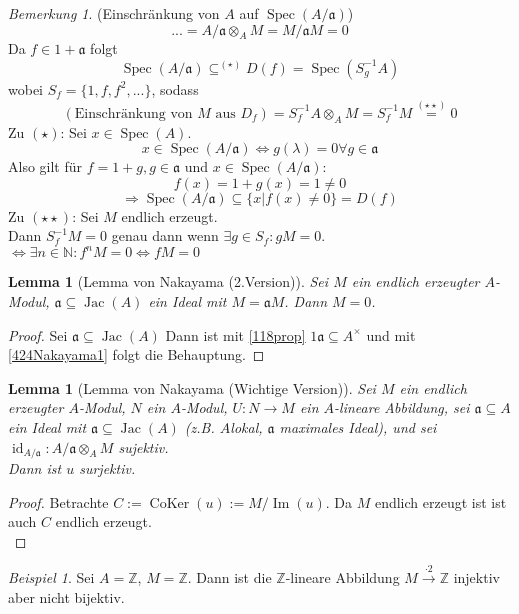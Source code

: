 \documentclass[10pt,a4paper]{article}
\newcommand{\N}{\ensuremath{\mathbb{N}}}
\newcommand{\Z}{\ensuremath{\mathbb{Z}}}
\newcommand{\la}{\ensuremath{\lambda}}
\newcommand{\Img}{\ensuremath{\operatorname{Im}}}
\newcommand{\Spec}{\ensuremath{\operatorname{Spec}}}
\newcommand{\id}{\operatorname{id}}
\newcommand{\CoKer}{\operatorname{CoKer}}
\newcommand{\Jac}{\ensuremath{\operatorname{Jac}}}
\newcounter{thm}[section]
\theoremstyle{definition}
\theoremstyle{plain}
\newtheorem{lem}[thm]{Lemma}
\theoremstyle{remark}
\newtheorem*{bem*}{Bemerkung}
\newtheorem*{exm*}{Beispiel}
\begin{document}
\begin{bem*}
	(Einschränkung von $A$ auf $\Spec(A/\mathfrak a)$)
	\[...=A/\mathfrak a\otimes_AM=M/\mathfrak aM=0\]
	Da $f\in 1+\mathfrak a$ folgt
	\[\Spec(A/\mathfrak a)\subseteq^{(\star)}D(f)=\Spec(S_{g}^{-1}A)\]
	wobei $S_f=\{1,f,f^2,...\}$, sodass
	\[(\text{Einschränkung von $M$ aus $D_f$})=S_f^{-1}A\otimes_AM=S_f^{-1}M\overset{(\star\star)}{=}0\]
	Zu $(\star)$: Sei $x\in\Spec(A)$.
	\[x\in\Spec(A/\mathfrak a)\Leftrightarrow g(\la)=0\forall g\in\mathfrak a \]
	Also gilt für $f=1+g,g\in\mathfrak a$ und $x\in\Spec(A/\mathfrak a)$:
	\[f(x)=1+g(x)=1\neq 0\]
	\[\Rightarrow \Spec(A/\mathfrak a)\subseteq \{x|f(x)\neq 0\}=D(f)\]
	Zu $(\star\star)$: Sei $M$ endlich erzeugt.\\
	Dann $S^{-1}_fM=0$ genau dann wenn $\exists g\in S_f:gM=0$.\\
	$\Leftrightarrow \exists n\in \N: f^nM=0\Leftrightarrow fM=0$
\end{bem*}

\begin{lem}[Lemma von Nakayama (2.Version)]
	\label{425Nakayama2}
	Sei $M$ ein endlich erzeugter $A$-Modul, $\mathfrak a\subseteq\Jac(A)$ ein Ideal mit $M=\mathfrak aM$. Dann $M=0$.
\end{lem}
\begin{proof}
	Sei $\mathfrak a\subseteq \Jac(A)$ Dann ist mit \ref{118prop} $1\mathfrak a\subseteq A^\times$ und mit \ref{424Nakayama1} folgt die Behauptung.
\end{proof}

\begin{lem}[Lemma von Nakayama (Wichtige Version)]
	\label{427Nakayamaw}
	Sei $M$ ein endlich erzeugter $A$-Modul, $N$ ein $A$-Modul, $U:N\rightarrow  M$ ein $A$-lineare Abbildung, sei $\mathfrak a\subseteq A$ ein Ideal mit $\mathfrak a\subseteq \Jac(A)$ (z.B. $A$lokal, $\mathfrak a$ maximales Ideal),
	und sei $\id_{A/\mathfrak a}:A/\mathfrak a\otimes_A M$ sujektiv.\\
	Dann ist $u$ surjektiv.
\end{lem}
\begin{proof}
	Betrachte $C:=\CoKer(u):=M/\Img(u)$. Da $M$ endlich erzeugt ist ist auch $C$ endlich erzeugt.\\
\end{proof}

\begin{exm*}
	Sei $A=\Z$, $M=\Z$. Dann ist die $\Z$-lineare Abbildung $M\xrightarrow{\cdot 2}\Z$ injektiv aber nicht bijektiv.
\end{exm*}
\end{document}
